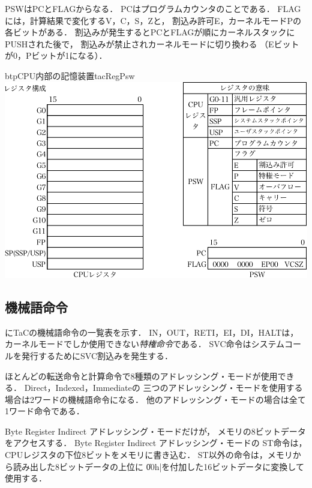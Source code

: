 PSWはPCとFLAGからなる．
PCはプログラムカウンタのことである．
FLAGには，計算結果で変化するV，C，S，Zと，
割込み許可E，カーネルモードPの各ビットがある．
割込みが発生するとPCとFLAGが順にカーネルスタックにPUSHされた後で，
割込みが禁止されカーネルモードに切り換わる
（Eビットが0，Pビットが1になる）．

\begin{myfig}{btp}{CPU内部の記憶装置}{tacRegPsw}
  \includegraphics[scale=0.7]{Tbl/TaC7a-instruction-p1-3-crop.pdf}
\end{myfig}

\subsection{機械語命令}
\label{tacMachineIns}
にTaCの機械語命令の一覧表を示す．
IN，OUT，RETI，EI，DI，HALTは，
カーネルモードでしか使用できない\emph{特権命令}である．
SVC命令はシステムコールを発行するためにSVC割込みを発生する．

ほとんどの転送命令と計算命令で8種類のアドレッシング・モードが使用できる．
Direct，Indexed，Immediateの
三つのアドレッシング・モードを使用する場合は2ワードの機械語命令になる．
他のアドレッシング・モードの場合は全て1ワード命令である．

Byte Register Indirect アドレッシング・モードだけが，
メモリの8ビットデータをアクセスする．
Byte Register Indirect アドレッシング・モードの
ST命令は，CPUレジスタの下位8ビットをメモリに書き込む．
ST以外の命令は，メモリから読み出した8ビットデータの上位に
\|00h|を付加した16ビットデータに変換して使用する．

